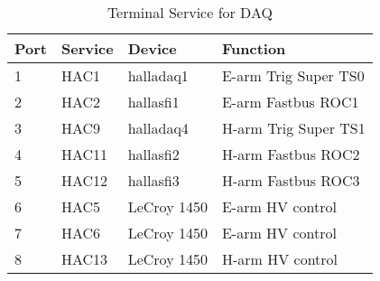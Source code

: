 \begin{table}\centering
\caption[Data Acquisition: Terminal Service for DAQ]{Terminal Service for DAQ}
\begin{tabular}{|l|l|l|l|}  \hline
Port  &   Service & Device & Function\\ \hline
 1    &   HAC1    & halladaq1  & E-arm Trig Super TS0\\
 2    &   HAC2    & hallasfi1  & E-arm Fastbus ROC1\\
 3    &   HAC9    & halladaq4 & H-arm Trig Super TS1 \\
 4    &   HAC11   & hallasfi2  & H-arm Fastbus ROC2\\
 5    &   HAC12   & hallasfi3  & H-arm Fastbus ROC3\\
 6    &   HAC5    & LeCroy 1450 & E-arm HV control\\
 7    &   HAC6    & LeCroy 1450 & E-arm HV control\\
 8    &   HAC13   & LeCroy 1450  & H-arm HV control\\
\hline
\end{tabular}
\end{table}




 
%
